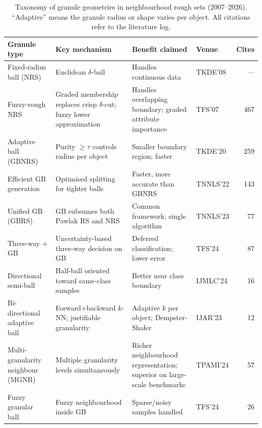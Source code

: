 \begin{table}[pos=!htbp]
\caption{Taxonomy of granule geometries in neighbourhood rough sets
(2007--2026).  ``Adaptive'' means the granule radius or shape varies
per object.  All citations refer to the literature log.}
\label{tab:granule_tax}
\centering\small
\setlength\tabcolsep{4pt}
\begin{tabular}{p{4.0cm}p{5.6cm}p{4.2cm}p{1.4cm}r}
\toprule
Granule type & Key mechanism & Benefit claimed & Venue & Cites \\
\midrule
Fixed-radius ball (NRS)~\cite{Hu2008NRS}
  & Euclidean $\delta$-ball
  & Handles continuous data
  & TKDE'08 & --- \\
\addlinespace
Fuzzy-rough NRS~\cite{JensenShen2007TFS,Cornelis2010IS}
  & Graded membership replaces crisp $\delta$-cut; fuzzy lower approximation
  & Handles overlapping boundary; graded attribute importance
  & TFS'07 & 467 \\
\addlinespace
Adaptive ball (GBNRS)~\cite{Xia2020GBNRS}
  & Purity $\geq\tau$ controls radius per object
  & Smaller boundary region; faster
  & TKDE'20 & 259 \\
\addlinespace
Efficient GB generation~\cite{Xia2022EfficientGB}
  & Optimised splitting for tighter balls
  & Faster, more accurate than GBNRS
  & TNNLS'22 & 143 \\
\addlinespace
Unified GB (GBRS)~\cite{Xia2023GBRS}
  & GB subsumes both Pawlak RS and NRS
  & Common framework; single algorithm
  & TNNLS'23 & 77 \\
\addlinespace
Three-way + GB~\cite{Xia2024TFS3WC}
  & Uncertainty-based three-way decision on GB
  & Deferred classification; lower error
  & TFS'24 & 87 \\
\addlinespace
Directional semi-ball~\cite{Qian2024directional}
  & Half-ball oriented toward same-class samples
  & Better near class boundary
  & IJMLC'24 & 16 \\
\addlinespace
Bi-directional adaptive ball~\cite{Ju2023bidirectional}
  & Forward+backward $k$-NN; justifiable granularity
  & Adaptive $k$ per object; Dempster-Shafer
  & IJAR'23 & 12 \\
\addlinespace
Multi-granularity neighbour (MGNR)~\cite{Xie2024TPAMI}
  & Multiple granularity levels simultaneously
  & Richer neighbourhood representation; superior on large-scale benchmarks
  & TPAMI'24 & 57 \\
\addlinespace
Fuzzy granular ball~\cite{Sun2024TFS}
  & Fuzzy neighbourhood inside GB
  & Sparse/noisy samples handled
  & TFS'24 & 26 \\

\end{tabular}
\end{table}
